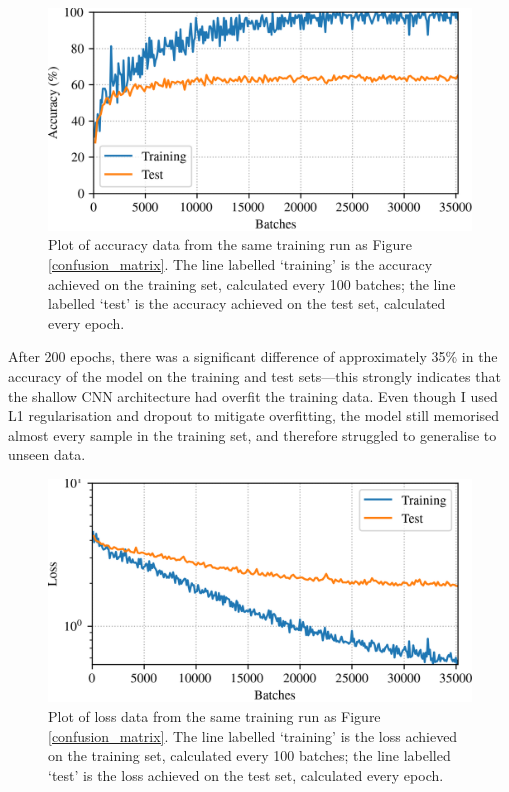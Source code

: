 \documentclass[conference]{IEEEtran}
\begin{document}
\begin{figure}[htbp]
    \centerline{\includegraphics[width=\columnwidth]{accuracy.png}}
    \caption{
        Plot of accuracy data from the same training run as Figure \ref{confusion_matrix}.
        The line labelled `training' is the accuracy achieved on the training set, calculated every 100 batches; the line labelled `test' is the accuracy achieved on the test set, calculated every epoch.}
    \label{accuracy_curves}
\end{figure}

After 200 epochs, there was a significant difference of approximately 35\% in the accuracy of the model on the training and test sets---this strongly indicates that the shallow CNN architecture had overfit the training data.
Even though I used L1 regularisation and dropout to mitigate overfitting, the model still memorised almost every sample in the training set, and therefore struggled to generalise to unseen data.

\begin{figure}[htbp]
    \centerline{\includegraphics[width=\columnwidth]{loss.png}}
    \caption{
        Plot of loss data from the same training run as Figure \ref{confusion_matrix}.
        The line labelled `training' is the loss achieved on the training set, calculated every 100 batches; the line labelled `test' is the loss achieved on the test set, calculated every epoch.
    }
    \label{loss_curves}
\end{figure}
\end{document}
